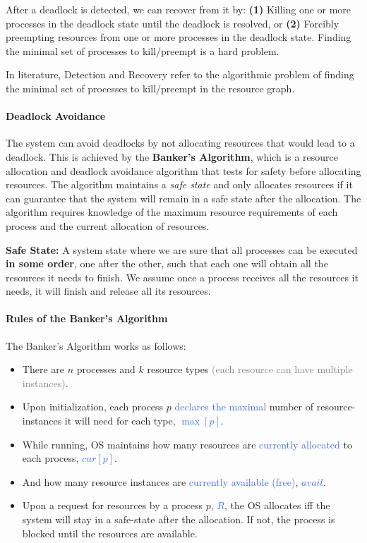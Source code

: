 \documentclass[openany,12pt]{book}
\newcommand{\blue}[1]{\textcolor{RoyalBlue}{#1}}
\newcommand{\gray}[1]{\textcolor{gray}{#1}}
\begin{document}
After a deadlock is detected, we can recover from it by: \textbf{(1)} Killing one or more processes in the deadlock state until the deadlock is resolved, or \textbf{(2)} Forcibly preempting resources from one or more processes in the deadlock state. Finding the minimal set of processes to kill/preempt is a hard problem.

In literature, Detection and Recovery refer to the algorithmic problem of finding the minimal set of processes to kill/preempt in the resource graph.

\paragraph{Deadlock Avoidance} The system can avoid deadlocks by not allocating resources that would lead to a deadlock. This is achieved by the \textbf{Banker's Algorithm}, which is a resource allocation and deadlock avoidance algorithm that tests for safety before allocating resources. The algorithm maintains a \textit{safe state} and only allocates resources if it can guarantee that the system will remain in a safe state after the allocation. The algorithm requires knowledge of the maximum resource requirements of each process and the current allocation of resources.

\textbf{Safe State:} A system state where we are sure that all processes can be executed \textbf{in some order}, one after the other, such that each one will obtain all the resources it needs to finish. We assume once a process receives all the resources it needs, it will finish and release all its resources. \par

\paragraph{Rules of the Banker's Algorithm} The Banker's Algorithm works as follows:
\begin{itemize}
  \item There are \(n\) processes and \(k\) resource types \gray{(each resource can have multiple instances)}.
  \item Upon initialization, each process \(p\) \blue{declares the maximal} number of resource-instances it will need for each type, \blue{\(\max[p]\)}.
  \item While running, OS maintains how many resources are \blue{currently allocated} to each process, \blue{\(cur[p]\)}.
  \item And how many resource instances are \blue{currently available (free)}, \blue{\(avail\)}.
  \item Upon a request for resources by a process \(p\), \blue{\(R\)}, the OS allocates iff the system will stay in a safe-state after the allocation. If not, the process is blocked until the resources are available.
\end{itemize}
\end{document}
